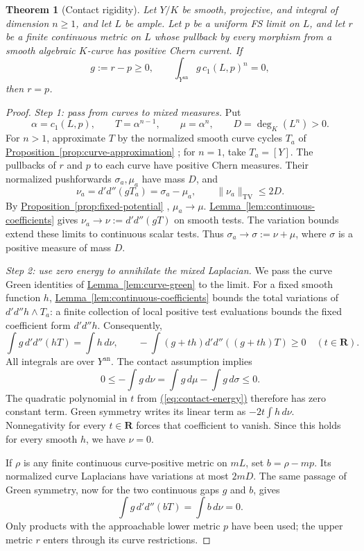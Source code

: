\documentclass[11pt]{amsart}
\newtheorem{theorem}{Theorem}[section]
\theoremstyle{definition}
\theoremstyle{remark}
\numberwithin{equation}{section}
\newcommand{\ddc}{d'd''}
\newcommand{\an}{\mathrm{an}}
\newcommand{\R}{\mathbf R}
\newcommand{\namedref}[2]{%
 \begingroup
 \ifstrequal{#1}{Section}{\hypersetup{linkcolor=sectionteal}}{%
  \ifstrequal{#1}{Appendix}{\hypersetup{linkcolor=sectionteal}}{}}%
 \hyperref[#2]{#1~\ref*{#2}}%
 \endgroup}
\renewcommand{\eqref}[1]{%
 \begingroup\hypersetup{linkcolor=equationviolet}%
 \hyperref[#1]{\textup{(\ref*{#1})}}%
 \endgroup}
\newcommand{\TV}{\mathrm{TV}}
\begin{document}
\begin{theorem}[Contact rigidity]\label{thm:contact}
Let \(Y/K\) be smooth, projective, and integral of dimension
\(n\geq1\), and let \(L\) be ample. Let \(p\) be a uniform FS
limit on \(L\), and let \(r\) be a finite continuous metric on
\(L\) whose pullback by every morphism from a smooth algebraic
\(K\)-curve has positive Chern current. If
\[
 g:=r-p\geq0,
 \qquad
 \int_{Y^\an}g\,c_1(L,p)^n=0,
\]
then \(r=p\).
\end{theorem}

\begin{proof}
\emph{Step 1: pass from curves to mixed measures.}
Put
\[
 \alpha=c_1(L,p),\qquad T=\alpha^{n-1},\qquad
 \mu=\alpha^n,\qquad D=\deg_K(L^n)>0.
\]
For \(n>1\), approximate \(T\) by the normalized smooth curve
cycles \(T_a\) of \namedref{Proposition}{prop:curve-approximation}; for
\(n=1\), take \(T_a=[Y]\). The pullbacks of \(r\) and \(p\)
to each curve have positive Chern measures. Their normalized
pushforwards \(\sigma_a,\mu_a\) have mass \(D\), and
\[
 \nu_a=\ddc(gT_a)=\sigma_a-\mu_a,
 \qquad\|\nu_a\|_{\TV}\leq2D.
\]
By \namedref{Proposition}{prop:fixed-potential}, \(\mu_a\to\mu\).
\namedref{Lemma}{lem:continuous-coefficients} gives
\(\nu_a\to\nu:=\ddc(gT)\) on smooth tests. The variation bounds
extend these limits to continuous scalar tests. Thus
\(\sigma_a\to\sigma:=\nu+\mu\), where \(\sigma\) is a positive
measure of mass \(D\).

\emph{Step 2: use zero energy to annihilate the mixed Laplacian.}
We pass the curve Green identities of \namedref{Lemma}{lem:curve-green}
to the limit. For a fixed smooth function \(h\),
\namedref{Lemma}{lem:continuous-coefficients} bounds the total variations of
\(\ddc h\wedge T_a\): a finite collection of local positive test
evaluations bounds the fixed coefficient form \(\ddc h\).
Consequently,
\begin{equation}\label{eq:contact-energy}
 \int g\,\ddc(hT)=\int h\,d\nu,
 \qquad
 -\int(g+th)\ddc((g+th)T)\geq0\quad(t\in\R).
\end{equation}
All integrals are over \(Y^\an\). The contact assumption implies
\[
 0\leq-\int g\,d\nu
   =\int g\,d\mu-\int g\,d\sigma\leq0.
\]
The quadratic polynomial in \(t\) from
\eqref{eq:contact-energy} therefore has zero constant term.
Green symmetry writes its linear term as \(-2t\int h\,d\nu\).
Nonnegativity for every \(t\in\R\) forces that coefficient to
vanish. Since this holds for every smooth \(h\), we have
\(\nu=0\).

If \(\rho\) is any finite continuous curve-positive metric on
\(mL\), set \(b=\rho-mp\). Its normalized curve Laplacians have
variations at most \(2mD\). The same passage of Green symmetry,
now for the two continuous gaps \(g\) and \(b\), gives
\begin{equation}\label{eq:contact-green}
 \int g\,\ddc(bT)=\int b\,d\nu=0.
\end{equation}
Only products with the approachable lower metric \(p\) have been
used; the upper metric \(r\) enters through its curve restrictions.


\end{proof}
\end{document}

